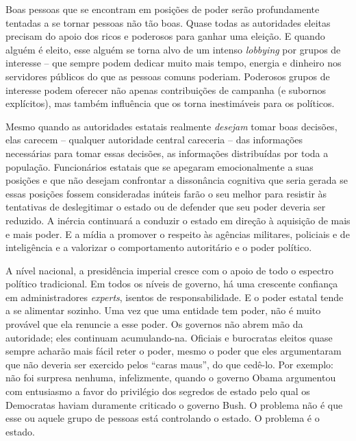 Boas pessoas que se encontram em posições de poder serão profundamente tentadas a se tornar pessoas não tão boas. Quase todas as autoridades eleitas precisam do apoio dos ricos e poderosos para ganhar uma eleição. E quando alguém é eleito, esse alguém se torna alvo de um intenso \emph{lobbying} por grupos de interesse -- que sempre podem dedicar muito mais tempo, energia e dinheiro nos servidores públicos do que as pessoas comuns poderiam. Poderosos grupos de interesse podem oferecer não apenas contribuições de campanha (e subornos explícitos), mas também influência que os torna inestimáveis para os políticos.

Mesmo quando as autoridades estatais realmente \emph{desejam} tomar boas decisões, elas carecem -- qualquer autoridade central careceria -- das informações necessárias para tomar essas decisões, as informações distribuídas por toda a população. Funcionários estatais que se apegaram emocionalmente a suas posições e que não desejam confrontar a dissonância cognitiva que seria gerada se essas posições fossem consideradas inúteis farão o seu melhor para resistir às tentativas de deslegitimar o estado ou de defender que seu poder deveria ser reduzido. A inércia continuará a conduzir o estado em direção à aquisição de mais e mais poder. E a mídia a promover o respeito às agências militares, policiais e de inteligência e a valorizar o comportamento autoritário e o poder político.

A nível nacional, a presidência imperial cresce com o apoio de todo o espectro político tradicional. Em todos os níveis de governo, há uma crescente confiança em administradores \emph{experts}, isentos de responsabilidade. E o poder estatal tende a se alimentar sozinho. Uma vez que uma entidade tem poder, não é muito provável que ela renuncie a esse poder. Os governos não abrem mão da autoridade; eles continuam acumulando-na. Oficiais e burocratas eleitos quase sempre acharão mais fácil reter o poder, mesmo o poder que eles argumentaram que não deveria ser exercido pelos ``caras maus'', do que cedê-lo. Por exemplo: não foi surpresa nenhuma, infelizmente, quando o governo Obama argumentou com entusiasmo a favor do privilégio dos segredos de estado pelo qual os Democratas haviam duramente criticado o governo Bush. O problema não é que esse ou aquele grupo de pessoas está controlando o estado. O problema é o estado.

